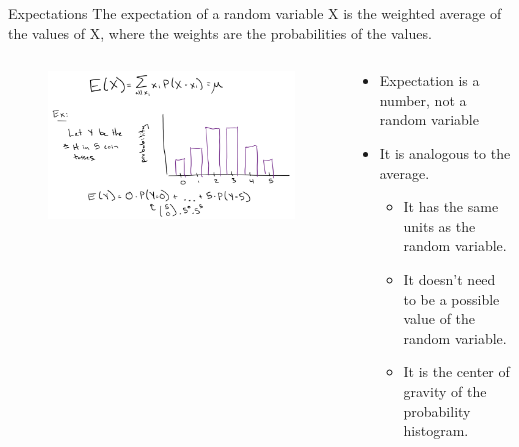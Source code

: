 \documentclass[aspectratio=169]{../latex_main/tntbeamer}  %
\begin{document}
	
	
	\begin{frame}{Expectations}
	    The expectation of a random variable X is the weighted average of the values of X, where the weights are the probabilities of the values.
	    \begin{columns}
	        \begin{column}{.4\textwidth}
                    \begin{figure}
                        \includegraphics[scale=.5]{Bild6}
                    \end{figure}
	        \end{column}
	        
	        
	        \begin{column}{.4\textwidth}
	            \begin{itemize}
	                \item Expectation is a number, not a random variable
	                \item It is analogous to the average.
	                \begin{itemize}
	                    \item It has the same units as the random variable.
	                    \item It doesn’t need to be a possible value of the random variable.
	                    \item It is the center of gravity of the probability histogram.
	                \end{itemize}
	            \end{itemize}
	        \end{column}
	    \end{columns}
	\end{frame}
	
	
	
\end{document}
